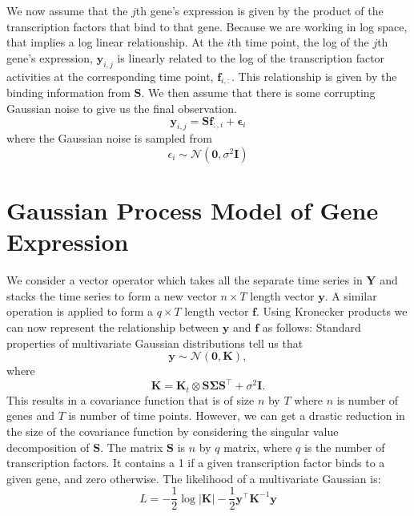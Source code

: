 We now assume that the $j$th gene's expression is given by the product of the transcription factors that bind to 
that gene. Because we are working in log space, that implies a log linear relationship. At the $i$th time point, 
the log of the $j$th gene's expression, $\mathbf{y}_{i,j}$ is linearly related to the log of the transcription 
factor activities at the corresponding time point, $\mathbf{f}_{i, :}$. This relationship is given by the binding 
information from $\mathbf{S}$. We then assume that there is some corrupting Gaussian noise to give us the final 
observation.
\begin{equation} \label{eq:yij}
  \mathbf{y}_{i, j} = \mathbf{S}\mathbf{f}_{:, i} + \boldsymbol{\epsilon}_i
\end{equation}  
where the Gaussian noise is sampled from
\begin{equation} \label{eq:epsi}
  \epsilon_i \sim \mathcal{N}(\mathbf{0}, \sigma^2 \mathbf{I})
\end{equation}

\section{Gaussian Process Model of Gene Expression}

We consider a vector operator which takes all the separate time series in $\mathbf{Y}$ and stacks the time series 
to form a new vector $n\times T$ length vector $\mathbf{y}$. A similar operation is applied to form a $q \times T$ 
length vector $\mathbf{f}$. Using Kronecker products we can now represent the relationship between $\mathbf{y}$ and 
$\mathbf{f}$ as follows:  
Standard properties of multivariate Gaussian distributions tell us that
\begin{equation} \label{eq:mGPd}
\mathbf{y} \sim \mathcal{N}(\mathbf{0}, \mathbf{K}),
\end{equation}
where
\begin{equation} \label{eq:K}
\mathbf{K} = \mathbf{K}_t \otimes \mathbf{S} \boldsymbol{\Sigma} \mathbf{S}^\top + \sigma^2 \mathbf{I}.
\end{equation}
This results in a covariance function that is of size $n$ by $T$ where $n$ is number of genes and $T$ is number of 
time points. However, we can get a drastic reduction in the size of the covariance function by considering 
the singular value decomposition of $\mathbf{S}$. 
The matrix $\mathbf{S}$ is $n$ by $q$ matrix, where $q$ is the number of transcription factors. It contains a 1 
if a given transcription factor binds to a given gene, and zero otherwise. 
The likelihood of a multivariate Gaussian is:
\begin{equation} \label{eq:Likelihood}
L = -\frac{1}{2} \log |\mathbf{K}| - \frac{1}{2} \mathbf{y}^\top \mathbf{K}^{-1} \mathbf{y}
\end{equation}

